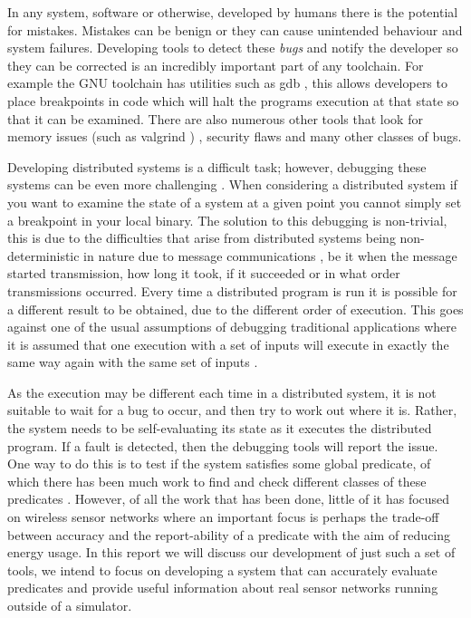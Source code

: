 In any system, software or otherwise, developed by humans there is the potential for mistakes. Mistakes can be benign or they can cause unintended behaviour and system failures. Developing tools to detect these \emph{bugs} and notify the developer so they can be corrected is an incredibly important part of any toolchain. For example the GNU toolchain has utilities such as gdb \cite{stallman1992gdb}, this allows developers to place breakpoints in code which will halt the programs execution at that state so that it can be examined. There are also numerous other tools that look for memory issues (such as valgrind \cite{seward2004valgrind}) \cite{Bond:2007:TBA:1297105.1297057,Nethercote:2007:SBM:1254810.1254820}, security flaws \cite{898880,976940} and many other classes of bugs.

Developing distributed systems is a difficult task; however, debugging these systems can be even more challenging \cite{345831}. When considering a distributed system if you want to examine the state of a system at a given point you cannot simply set a breakpoint in your local binary. The solution to this debugging is non-trivial, this is due to the difficulties that arise from distributed systems being non-deterministic in nature due to message communications \cite{1676929,Fagerstrom:1988:DTD:55823.55833}, be it when the message started transmission, how long it took, if it succeeded or in what order transmissions occurred. Every time a distributed program is run it is possible for a different result to be obtained, due to the different order of execution. This goes against one of the usual assumptions of debugging traditional applications where it is assumed that one execution with a set of inputs will execute in exactly the same way again with the same set of inputs \cite[Chapter~10]{lethbridge2001object}.

As the execution may be different each time in a distributed system, it is not suitable to wait for a bug to occur, and then try to work out where it is. Rather, the system needs to be self-evaluating its state as it executes the distributed program. If a fault is detected, then the debugging tools will report the issue. One way to do this is to test if the system satisfies some global predicate, of which there has been much work to find and check different classes of these predicates \cite{553309,345831,277788}. However, of all the work that has been done, little of it has focused on wireless sensor networks where an important focus is perhaps the trade-off between accuracy and the report-ability of a predicate with the aim of reducing energy usage. In this report we will discuss our development of just such a set of tools, we intend to focus on developing a system that can accurately evaluate predicates and provide useful information about real sensor networks running outside of a simulator.


